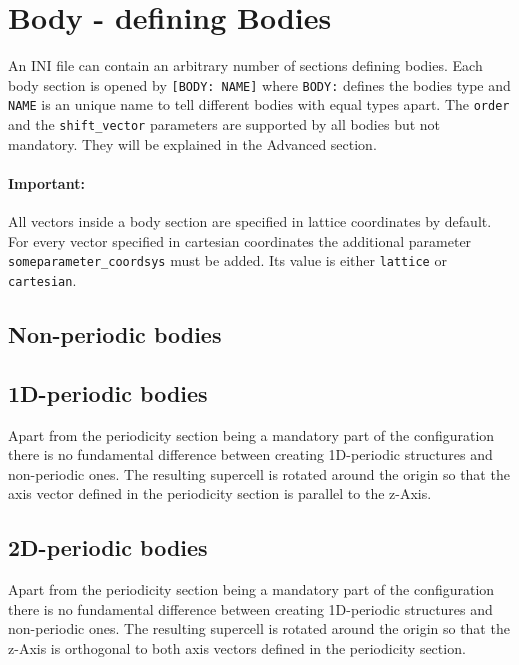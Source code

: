 \section{Body - defining Bodies}

An INI file can contain an arbitrary number of sections defining bodies. Each body section is opened by \lstinline{[BODY: NAME]} where \lstinline{BODY:} defines the bodies type and \lstinline{NAME} is an unique name to tell different bodies with equal types apart. The \lstinline{order} and the \lstinline{shift_vector} parameters are supported by all bodies but not mandatory. They will be explained in the Advanced section. %

\paragraph{Important:} All vectors inside a body section are specified in lattice coordinates by default. For every vector specified in cartesian coordinates the additional parameter \lstinline{someparameter_coordsys} must be added. Its value is either \lstinline{lattice} or \lstinline{cartesian}.

\subsection{Non-periodic bodies}



\subsection{1D-periodic bodies}
Apart from the periodicity section being a mandatory part of the configuration there is no fundamental difference between creating 1D-periodic structures and non-periodic ones. The resulting supercell is rotated around the origin so that the axis vector defined in the periodicity section is parallel to the z-Axis.




\subsection{2D-periodic bodies}

Apart from the periodicity section being a mandatory part of the configuration there is no fundamental difference between creating 1D-periodic structures and non-periodic ones. The resulting supercell is rotated around the origin so that the z-Axis is orthogonal to both axis vectors defined in the periodicity section.


